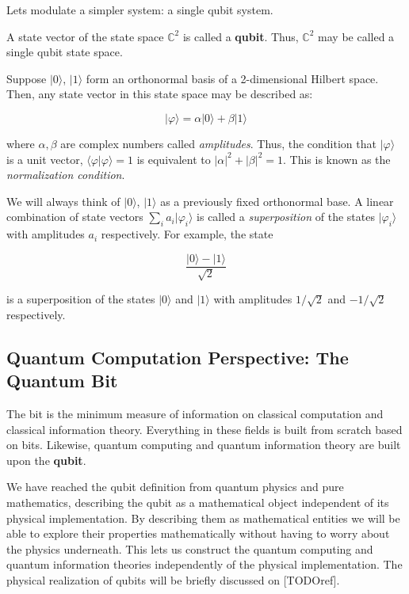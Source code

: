 Lets modulate a simpler system: a single qubit system.

\begin{definition}
	A state vector of the state space $\mathds{C}^{2}$ is called a \textbf{qubit}. Thus, $\mathds{C}^{2}$ may be called a single qubit state space.
\end{definition}

Suppose $|0\rangle$, $|1\rangle$ form an orthonormal basis of a 2-dimensional Hilbert space. Then, any state vector in this state space may be described as:

$$ |\varphi\rangle = \alpha|0\rangle + \beta|1\rangle $$

where $\alpha,\beta$ are complex numbers called \emph{amplitudes}. Thus, the condition that $|\varphi\rangle$ is a unit vector, $\langle\varphi|\varphi\rangle = 1$ is equivalent to $|\alpha|^2 + |\beta|^2 = 1$. This is known as the \emph{normalization condition}.

We will always think of $|0\rangle$, $|1\rangle$ as a previously fixed orthonormal base. A linear combination of state vectors $\sum_i a_i |\varphi_i\rangle$ is called a \emph{superposition} of the states $|\varphi_i\rangle$ with amplitudes $a_i$ respectively. For example, the state

$$ \frac{|0\rangle - |1\rangle}{\sqrt 2} $$

is a superposition of the states $|0\rangle$ and $|1\rangle$ with amplitudes $1/\sqrt 2$ and $-1/\sqrt 2$ respectively.


\subsection{Quantum Computation Perspective: The Quantum Bit}


The bit is the minimum measure of information on classical computation and classical information theory. Everything in these fields is built from scratch based on bits. Likewise, quantum computing and quantum information theory are built upon the \textbf{qubit}.

We have reached the qubit definition from quantum physics and pure mathematics, describing the qubit as a mathematical object independent of its physical implementation. By describing them as mathematical entities we will be able to explore their properties mathematically without having to worry about the physics underneath. This lets us construct the quantum computing and quantum information theories independently of the physical implementation. The physical realization of qubits will be briefly discussed on [TODOref].

